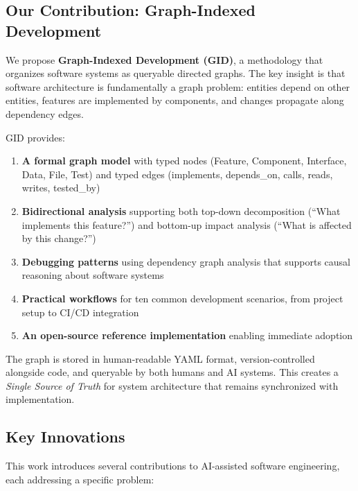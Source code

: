 \documentclass[11pt,a4paper]{article}
\begin{document}
\subsection{Our Contribution: Graph-Indexed Development}

We propose \textbf{Graph-Indexed Development (GID)}, a methodology that organizes software systems as queryable directed graphs. The key insight is that software architecture is fundamentally a graph problem: entities depend on other entities, features are implemented by components, and changes propagate along dependency edges.

GID provides:
\begin{enumerate}[noitemsep]
    \item \textbf{A formal graph model} with typed nodes (Feature, Component, Interface, Data, File, Test) and typed edges (implements, depends\_on, calls, reads, writes, tested\_by)
    \item \textbf{Bidirectional analysis} supporting both top-down decomposition (``What implements this feature?'') and bottom-up impact analysis (``What is affected by this change?'')
    \item \textbf{Debugging patterns} using dependency graph analysis that supports causal reasoning about software systems
    \item \textbf{Practical workflows} for ten common development scenarios, from project setup to CI/CD integration
    \item \textbf{An open-source reference implementation} enabling immediate adoption
\end{enumerate}

The graph is stored in human-readable YAML format, version-controlled alongside code, and queryable by both humans and AI systems. This creates a \emph{Single Source of Truth} for system architecture that remains synchronized with implementation.

\subsection{Key Innovations}

This work introduces several contributions to AI-assisted software engineering, each addressing a specific problem:
\end{document}
